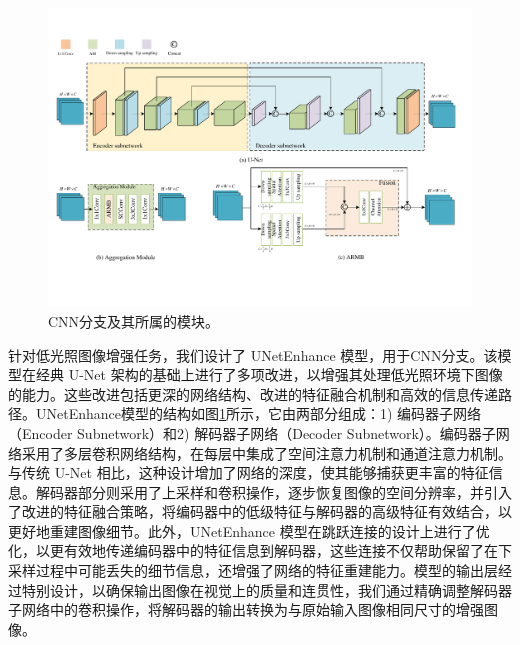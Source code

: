 \documentclass[a4paper]{ctexart}
\begin{document}
	\begin{figure}[htb]
		\centering 
		\setlength{\abovecaptionskip}{-1.5cm}
		\includegraphics[width=\columnwidth]{picture/LLIE/My Architecture/U-Net and AM}
		\caption{
			\label{fig: U-Net and AM} 
			CNN分支及其所属的模块。
		}
	\end{figure}
	
	针对低光照图像增强任务，我们设计了 UNetEnhance 模型，用于CNN分支。该模型在经典 U-Net 架构的基础上进行了多项改进，以增强其处理低光照环境下图像的能力。这些改进包括更深的网络结构、改进的特征融合机制和高效的信息传递路径。UNetEnhance模型的结构如图\ref{fig: U-Net and AM}所示，它由两部分组成：1) 编码器子网络（Encoder Subnetwork）和2) 解码器子网络（Decoder Subnetwork）。编码器子网络采用了多层卷积网络结构，在每层中集成了空间注意力机制和通道注意力机制\cite{woo2018cbam}。与传统 U-Net 相比，这种设计增加了网络的深度，使其能够捕获更丰富的特征信息。解码器部分则采用了上采样和卷积操作，逐步恢复图像的空间分辨率，并引入了改进的特征融合策略，将编码器中的低级特征与解码器的高级特征有效结合，以更好地重建图像细节。此外，UNetEnhance 模型在跳跃连接的设计上进行了优化，以更有效地传递编码器中的特征信息到解码器，这些连接不仅帮助保留了在下采样过程中可能丢失的细节信息，还增强了网络的特征重建能力。模型的输出层经过特别设计，以确保输出图像在视觉上的质量和连贯性，我们通过精确调整解码器子网络中的卷积操作，将解码器的输出转换为与原始输入图像相同尺寸的增强图像。
	
\end{document}
